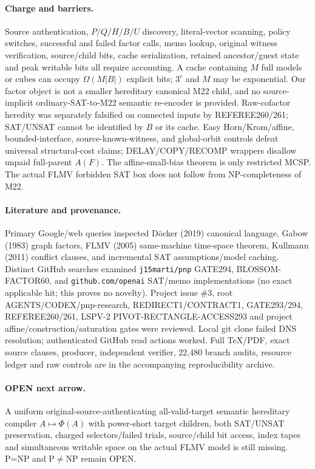 \documentclass[10pt]{article}
\begin{document}
\paragraph{Charge and barriers.}
Source authentication, $P/Q/H/B/U$ discovery, literal-vector scanning, policy switches, successful and failed factor calls, memo lookup, original witness verification, source/child bits, cache serialization, retained ancestor/guest state and peak writable bits all require accounting. A cache containing $M$ full models or cubes can occupy $\Omega(M|B|)$ explicit bits; $3^r$ and $M$ may be exponential. Our factor object is not a smaller hereditary canonical M22 child, and no source-implicit ordinary-SAT-to-M22 semantic re-encoder is provided. Raw-cofactor heredity was separately falsified on connected inputs by REFEREE260/261; SAT/UNSAT cannot be identified by $B$ or its cache. Easy Horn/Krom/affine, bounded-interface, source-known-witness, and global-orbit controls defeat universal structural-cost claims; DELAY/COPY/RECOMP wrappers disallow unpaid full-parent $A(F)$. The affine-small-bias theorem is only restricted MCSP. The actual FLMV forbidden SAT box does not follow from NP-completeness of M22.

\paragraph{Literature and provenance.}
Primary Google/web queries inspected D\"ocker (2019) canonical language, Gabow (1983) graph factors, FLMV (2005) same-machine time-space theorem, Kullmann (2011) conflict clauses, and incremental SAT assumptions/model caching. Distinct GitHub searches examined \texttt{j15marti/pnp} GATE294, BLOSSOM-FACTOR60, and \texttt{github.com/openai} SAT/memo implementations (no exact applicable hit; this proves no novelty). Project issue \#3, root AGENTS/CODEX/pnp-research, REDIRECT1/CONTRACT1, GATE293/294, REFEREE260/261, LSPV-2 PIVOT-RECTANGLE-ACCESS293 and project affine/construction/saturation gates were reviewed. Local git clone failed DNS resolution; authenticated GitHub read actions worked. Full TeX/PDF, exact source clauses, producer, independent verifier, 22,480 branch audits, resource ledger and raw controls are in the accompanying reproducibility archive.

\paragraph{OPEN next arrow.}
A uniform original-source-authenticating all-valid-target semantic hereditary compiler $A\mapsto\Phi(A)$ with power-short target children, both SAT/UNSAT preservation, charged selectors/failed trials, source/child bit access, index tapes and simultaneous writable space on the actual FLMV model is still missing. P=NP and P$\ne$NP remain OPEN.
\end{document}
